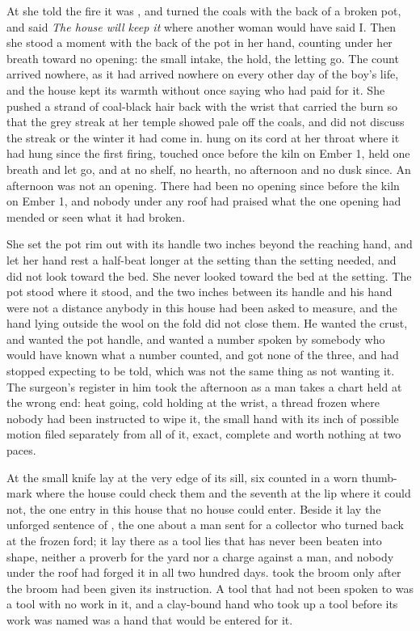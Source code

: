 At  she told the fire it was , and turned the coals with the back of a broken pot, and said \emph{The house will keep it} where another woman would have said I. Then she stood a moment with the back of the pot in her hand, counting under her breath toward no opening: the small intake, the hold, the letting go. The count arrived nowhere, as it had arrived nowhere on every other day of the boy's life, and the house kept its warmth without once saying who had paid for it. She pushed a strand of coal-black hair back with the wrist that carried the burn so that the grey streak at her temple showed pale off the coals, and did not discuss the streak or the winter it had come in.  hung on its cord at her throat where it had hung since the first firing, touched once before the kiln on Ember 1, held one breath and let go, and at no shelf, no hearth, no afternoon and no dusk since. An afternoon was not an opening. There had been no opening since before the kiln on Ember 1, and nobody under any roof had praised what the one opening had mended or seen what it had broken.

She set the pot rim out with its handle two inches beyond the reaching hand, and let her hand rest a half-beat longer at the setting than the setting needed, and did not look toward the bed. She never looked toward the bed at the setting. The pot stood where it stood, and the two inches between its handle and his hand were not a distance anybody in this house had been asked to measure, and the hand lying outside the wool on the fold did not close them. He wanted the crust, and wanted the pot handle, and wanted a number spoken by somebody who would have known what a number counted, and got none of the three, and had stopped expecting to be told, which was not the same thing as not wanting it. The surgeon's register in him took the afternoon as a man takes a chart held at the wrong end: heat going, cold holding at the wrist, a thread frozen where nobody had been instructed to wipe it, the small hand with its inch of possible motion filed separately from all of it, exact, complete and worth nothing at two paces.

\scenebreak

At  the small knife lay at the very edge of its sill, six counted in a worn thumb-mark where the house could check them and the seventh at the lip where it could not, the one entry in this house that no house could enter. Beside it lay the unforged sentence of , the one about a man sent for a collector who turned back at the frozen ford; it lay there as a tool lies that has never been beaten into shape, neither a proverb for the yard nor a charge against a man, and nobody under the roof had forged it in all two hundred days.  took the broom only after the broom had been given its instruction. A tool that had not been spoken to was a tool with no work in it, and a clay-bound hand who took up a tool before its work was named was a hand that would be entered for it.

